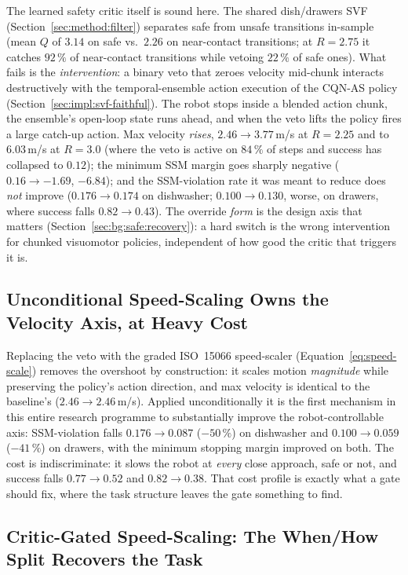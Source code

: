 \documentclass[11pt,a4paper]{report}
\newcommand{\ssm}{SSM}
\newcommand{\iso}{ISO~15066}
\newcommand{\cqnas}{CQN-AS}
\begin{document}
The learned safety critic itself is sound here. The shared
dish/drawers SVF (Section~\ref{sec:method:filter}) separates safe
from unsafe transitions in-sample (mean $Q$ of $3.14$ on safe vs.\
$2.26$ on near-contact transitions; at $R = 2.75$ it catches
$92\,\%$ of near-contact transitions while vetoing $22\,\%$ of safe
ones). What fails is the \emph{intervention}: a binary veto that
zeroes velocity mid-chunk interacts destructively with the
temporal-ensemble action execution of the \cqnas{} policy
(Section~\ref{sec:impl:svf-faithful}). The robot stops inside a
blended action chunk, the ensemble's open-loop state runs ahead, and
when the veto lifts the policy fires a large catch-up action.
Max velocity \emph{rises}, $2.46 \to 3.77$\,m/s at $R = 2.25$ and to
$6.03$\,m/s at $R = 3.0$ (where the veto is active on $84\,\%$ of
steps and success has collapsed to $0.12$); the minimum \ssm{} margin
goes sharply negative ($0.16 \to -1.69$, $-6.84$); and the
\ssm{}-violation rate it was meant to reduce does \emph{not} improve
($0.176 \to 0.174$ on dishwasher; $0.100 \to 0.130$, worse, on
drawers, where success falls $0.82 \to 0.43$). The override
\emph{form} is the design axis that matters
(Section~\ref{sec:bg:safe:recovery}): a hard switch is the wrong
intervention for chunked visuomotor policies, independent of how
good the critic that triggers it is.

\subsection{Unconditional Speed-Scaling Owns the Velocity Axis, at Heavy Cost}
\label{sec:results:r2-uncond}

Replacing the veto with the graded \iso{} speed-scaler
(Equation~\ref{eq:speed-scale}) removes the overshoot by
construction: it scales motion \emph{magnitude} while preserving the
policy's action direction, and max velocity is identical to the
baseline's ($2.46 \to 2.46$\,m/s). Applied unconditionally it is the first
mechanism in this entire research programme to substantially improve
the robot-controllable axis: \ssm{}-violation falls $0.176 \to 0.087$
($-50\,\%$) on dishwasher and $0.100 \to 0.059$ ($-41\,\%$) on
drawers, with the minimum stopping margin improved on both. The cost
is indiscriminate: it slows the robot at \emph{every} close approach,
safe or not, and success falls $0.77 \to 0.52$ and $0.82 \to 0.38$.
That cost profile is exactly what a gate should fix, where the task
structure leaves the gate something to find.

\subsection{Critic-Gated Speed-Scaling: The When/How Split Recovers the Task}
\label{sec:results:r2-gated}
\end{document}
